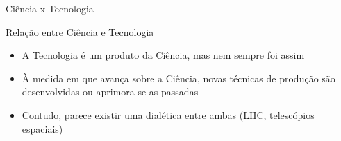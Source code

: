 \begin{frame}{Ciência x Tecnologia}
\begin{block}{Relação entre Ciência e Tecnologia}
\begin{itemize}
    \item A Tecnologia é um produto da Ciência, mas nem sempre foi assim
    \item À medida em que avança sobre a Ciência, novas técnicas de produção são desenvolvidas ou aprimora-se as passadas
    \item Contudo, parece existir uma dialética entre ambas (LHC, telescópios espaciais)
\end{itemize}
\end{block}

\end{frame}

